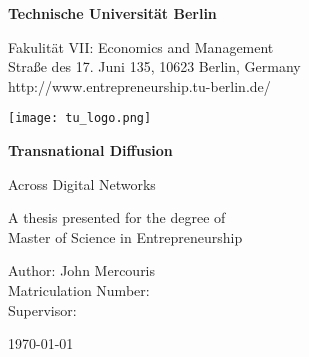\begin{titlepage}
    \begin{center}
        \vspace*{1cm}

        \Huge
        \textbf{Technische Universit{\"a}t Berlin}

        \vspace{0.50cm}

        \Large
        Fakulit{\"a}t VII: Economics and Management\\
        Stra{\ss}e des 17. Juni 135, 10623 Berlin, Germany\\
        http://www.entrepreneurship.tu-berlin.de/\\

        \vspace{1.25cm}

        \texttt{[image: tu\_logo.png]}

        \vspace{1.25cm}
        
        \Huge
        \textbf{Transnational Diffusion}
        
        \vspace{0.25cm}
        \LARGE
        Across Digital Networks
        
        \vspace{1.0cm}
        
        A thesis presented for the degree of\\
        Master of Science in Entrepreneurship
        
        \vspace{1.5cm}
                
        \Large
        Author: John Mercouris\\
        Matriculation Number: \\
        Supervisor: \\

        \vspace{1.0cm}
        
        \today
        
    \end{center}
\end{titlepage}
